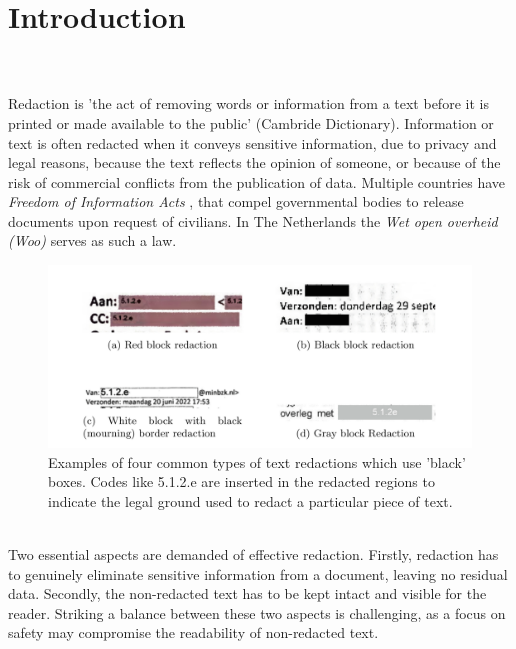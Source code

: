 \chapter{Introduction}

\\\\
Redaction is 'the act of removing words or information from a text before it is printed or made available to the public' (Cambride Dictionary). Information or text is often redacted when it conveys sensitive information, due to privacy and legal reasons, because the text reflects the opinion of someone, or because of the risk of commercial conflicts from the publication of data. Multiple countries have \textit{Freedom of Information Acts} \cite{USAFia}, that compel governmental bodies to release documents upon request of civilians. In The Netherlands the \textit{Wet open overheid (Woo)} \cite{WooWebsite} serves as such a law. 
\begin{figure}[h]
\includegraphics[width=\textwidth]{media/img.png}
\centering
\caption{Examples of four common types of text redactions which use 'black' boxes. Codes like 5.1.2.e are inserted in the redacted regions to indicate the legal ground used to redact a particular piece of text.}
\label{fig:redactionExamples}
\end{figure}\\
Two essential aspects are demanded of effective redaction. Firstly, redaction has to genuinely eliminate sensitive information from a document, leaving no residual data. Secondly, the non-redacted text has to be kept intact and visible for the reader. Striking a balance between these two aspects is challenging, as a focus on safety may compromise the readability of non-redacted text.
